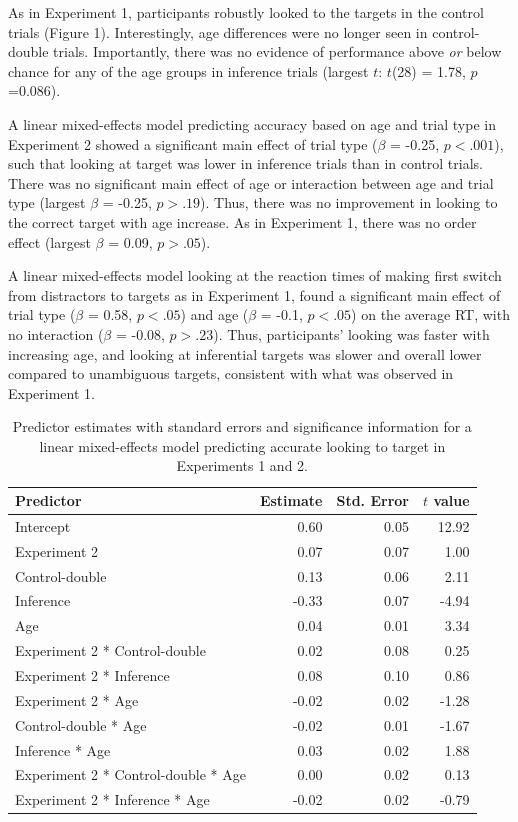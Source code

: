 \documentclass[a4paper,man,apacite,floatsintext]{apa6}
\begin{document}
As in Experiment 1, participants robustly looked to the targets in the
control trials (Figure 1). Interestingly, age differences were no longer
seen in control-double trials. Importantly, there was no evidence of
performance above \emph{or} below chance for any of the age groups in
inference trials (largest \(t\): \(t\)(28) = 1.78, \(p\) =0.086).

A linear mixed-effects model predicting accuracy based on age and trial
type in Experiment 2 showed a significant main effect of trial type
(\(\beta\) = -0.25, \(p <.001\)), such that looking at target was lower
in inference trials than in control trials. There was no significant
main effect of age or interaction between age and trial type (largest
\(\beta\) = -0.25, \(p >.19\)). Thus, there was no improvement in
looking to the correct target with age increase. As in Experiment 1,
there was no order effect (largest \(\beta\) = 0.09, \(p >.05\)).

A linear mixed-effects model looking at the reaction times of making
first switch from distractors to targets as in Experiment 1, found a
significant main effect of trial type (\(\beta\) = 0.58, \(p <.05\)) and
age (\(\beta\) = -0.1, \(p <.05\)) on the average RT, with no
interaction (\(\beta\) = -0.08, \(p >.23\)). Thus, participants' looking
was faster with increasing age, and looking at inferential targets was
slower and overall lower compared to unambiguous targets, consistent
with what was observed in Experiment 1.

\begin{table}[tb]
\centering
\begin{tabular}{lrrr}
 Predictor & Estimate & Std. Error & $t$ value \\ 
  \hline
Intercept & 0.60 & 0.05 & 12.92 \\ 
  Experiment 2 & 0.07 & 0.07 & 1.00 \\ 
  Control-double & 0.13 & 0.06 & 2.11 \\ 
  Inference & -0.33 & 0.07 & -4.94 \\ 
  Age & 0.04 & 0.01 & 3.34 \\ 
  Experiment 2 * Control-double & 0.02 & 0.08 & 0.25 \\ 
  Experiment 2 * Inference & 0.08 & 0.10 & 0.86 \\ 
  Experiment 2 * Age & -0.02 & 0.02 & -1.28 \\ 
  Control-double * Age & -0.02 & 0.01 & -1.67 \\ 
  Inference * Age & 0.03 & 0.02 & 1.88 \\ 
  Experiment 2 * Control-double * Age & 0.00 & 0.02 & 0.13 \\ 
  Experiment 2 * Inference * Age & -0.02 & 0.02 & -0.79 \\ 
   \hline
\end{tabular}
\caption{Predictor estimates with standard errors and significance information for a linear mixed-effects model predicting accurate looking to target in Experiments 1 and 2.} 
\label{tab:exp2_tab}
\end{table}
\end{document}
